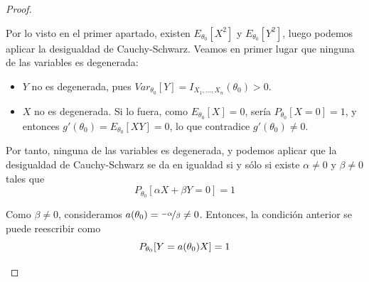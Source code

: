\begin{teo}
\begin{proof}
\begin{enumerate}
            Por lo visto en el primer apartado, existen $E_{\theta_0}[X^2]$ y $E_{\theta_0}[Y^2]$, luego podemos aplicar la desigualdad de Cauchy-Schwarz. Veamos en primer lugar que ninguna de las variables es degenerada:
            \begin{itemize}
                \item $Y$ no es degenerada, pues $Var_{\theta_0}[Y]=I_{X_1,\ldots,X_n}(\theta_0)>0$.
                \item $X$ no es degenerada. Si lo fuera, como $E_{\theta_0}[X]=0$, sería $P_{\theta_0}[X=0]=1$, y entonces
                $g'(\theta_0)=E_{\theta_0}[XY]=0$, lo que contradice $g'(\theta_0)\neq 0$.
            \end{itemize}

            Por tanto, ninguna de las variables es degenerada, y podemos aplicar que la desigualdad de Cauchy-Schwarz se da en igualdad si y sólo si existe $\alpha\neq 0$ y $\beta\neq 0$ tales que
            $$P_{\theta_0}[\alpha X+\beta Y=0]=1$$

            Como $\beta\neq 0$, consideramos $a(\theta_0)=\nicefrac{-\alpha}{\beta}\neq 0$. Entonces, la condición anterior se puede reescribir como
            \begin{equation*}
                P_{\theta_0}[Y=a(\theta_0)X]=1\qedhere
            \end{equation*}
        \end{enumerate}
    \end{proof}

\end{teo}


